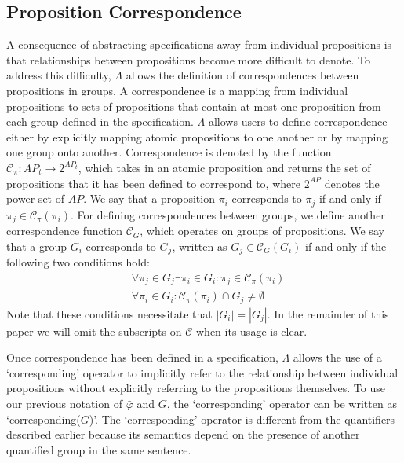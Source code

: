 \subsection{Proposition Correspondence} 
A consequence of abstracting specifications away from individual propositions is that relationships between propositions become more difficult to denote. 
To address this difficulty, $\Lambda$ allows the definition of correspondences between propositions in groups. 
A correspondence is a mapping from individual propositions to sets of propositions that contain at most one proposition from each group defined in the specification. 
$\Lambda$ allows users to define correspondence either by explicitly mapping atomic propositions to one another or by mapping one group onto another. 
Correspondence is denoted by the function $\mathcal{C}_\pi: AP_t \rightarrow 2^{AP_t}$, which takes in an atomic proposition and returns the set of propositions that it has been defined to correspond to, where $2^{AP}$ denotes the power set of $AP$. We say that a proposition $\pi_i$ corresponds to $\pi_j$ if and only if $\pi_j \in \mathcal{C}_\pi(\pi_i)$. 
For defining correspondences between groups, we define another correspondence function $\mathcal{C}_G$, which operates on groups of propositions.
We say that a group $G_i$ corresponds to $G_j$, written as $G_j \in \mathcal{C}_G(G_i)$ if and only if the following two conditions hold:
\begin{subequations}
\begin{align}
	&\forall \pi_j \in G_j \exists \pi_i \in G_i : \pi_j \in \mathcal{C}_\pi(\pi_i) \\
	&\forall \pi_i \in G_i : \mathcal{C}_\pi(\pi_i) \cap G_j \neq \emptyset
\end{align}
\end{subequations}
Note that these conditions necessitate that $|G_i| = |G_j|$. 
In the remainder of this paper we will omit the subscripts on $\mathcal{C}$ when its usage is clear. 
\par Once correspondence has been defined in a specification, $\Lambda$ allows the use of a `corresponding' operator to implicitly refer to the relationship between individual propositions without explicitly referring to the propositions themselves. 
To use our previous notation of $\bar{\varphi}$ and $G$, the `corresponding' operator can be written as `corresponding($G$)'. 
The `corresponding' operator is different from the quantifiers described earlier because its semantics depend on the presence of another quantified group in the same sentence. 
